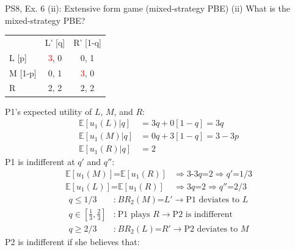 \begin{frame}{PS8, Ex. 6 (ii): Extensive form game (mixed-strategy PBE)}
    (ii) What is the mixed-strategy PBE? \vspace{-10pt}
    \begin{multicols}{2}
      \begin{table}
        \begin{tabular}{l|c|c|}
          \multicolumn{1}{c}{} & \multicolumn{1}{c}{L' [q]} & \multicolumn{1}{c}{R' [1-q]} \\\cline{2-3}
          L [p]   & \textcolor{red}{3}, 0 & 0, \color{blue}1 \\\cline{2-3}
          M [1-p] & 0, \color{blue}1 & \textcolor{red}{3}, 0 \\\cline{2-3}
          R       & 2, \color{blue}2 & 2, \color{blue}2 \\\cline{2-3}
        \end{tabular}
      \end{table} \vspace{-6pt}
      P1's expected utility of $L$, $M$, and $R$: \vspace{-6pt}
      \begin{align*}
        \mathbb{E}[u_1(L)|q]&=3q+0[1-q]=3q\\
        \mathbb{E}[u_1(M)|q]&=0q+3[1-q]=3-3p\\
        \mathbb{E}[u_1(R)|q]&=2
      \end{align*}
      P1 is indifferent at $q'$ and $q''$: \vspace{-6pt}
      \begin{align*}
        \mathbb{E}[u_1(M)]\text{=}\mathbb{E}[u_1(R)]&\Rightarrow \text{3-3}q\text{=}2\Rightarrow q'\text{=}1/3\\
        \mathbb{E}[u_1(L)]\text{=}\mathbb{E}[u_1(R)]&\Rightarrow 3q\text{=}2\Rightarrow q''\text{=}2/3
      \end{align*} \vspace{-20pt}
      \begin{align*}
        q\leq1/3&\text{:}\ BR_2(M)\text{=}L'\rightarrow\text{P1 deviates to }L\\
        q\text{$\in$}{\textstyle\left[\frac{1}{3},\frac{2}{3}\right]}&\text{:}\ \text{P1 plays }R\rightarrow\text{P2 is indifferent}\\
        q\geq2/3&\text{:}\ BR_2(L)\text{=}R'\rightarrow\text{P2 deviates to }M
      \end{align*}
      P2 is indifferent if she believes that: \vspace{-6pt}

\end{multicols}
\end{frame}
